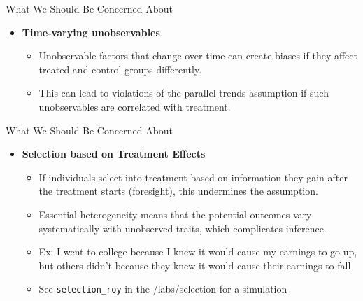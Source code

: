 \documentclass{beamer}
\begin{document}
\begin{frame}{What We Should Be Concerned About}

\begin{itemize}
    \item \textbf{Time-varying unobservables}
    \begin{itemize}
        \item Unobservable factors that change over time can create biases if they affect treated and control groups differently.
        \item This can lead to violations of the parallel trends assumption if such unobservables are correlated with treatment.
    \end{itemize}
    
\end{itemize}
\end{frame}



\begin{frame}{What We Should Be Concerned About}

    \begin{itemize}
    \item \textbf{Selection based on Treatment Effects}
    \begin{itemize}
        \item If individuals select into treatment based on information they gain after the treatment starts (foresight), this undermines the assumption.
        \item Essential heterogeneity means that the potential outcomes vary systematically with unobserved traits, which complicates inference.
        \item Ex: I went to college because I knew it would cause my earnings to go up, but others didn't because they knew it would cause their earnings to fall
        \item See \texttt{selection_roy} in the /labs/selection for a simulation
    \end{itemize}
    \end{itemize}
    
\end{frame}
\end{document}
